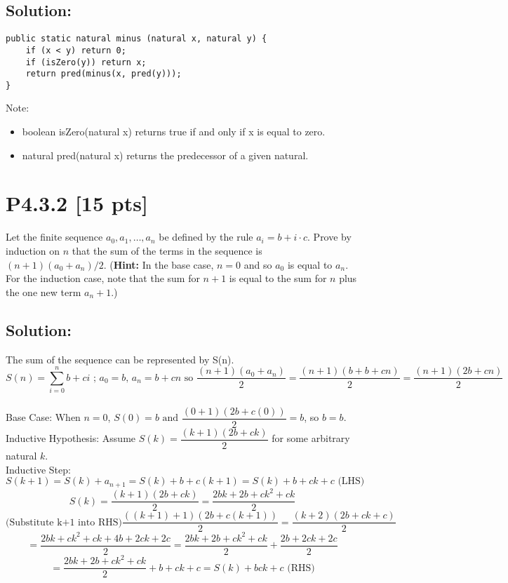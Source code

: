 \documentclass[12pt]{article}
\begin{document}
\subsection*{\textbf{Solution:}}

\begin{lstlisting}
public static natural minus (natural x, natural y) {
	if (x < y) return 0;
	if (isZero(y)) return x;
	return pred(minus(x, pred(y)));
}
\end{lstlisting}

Note:\\
\begin{itemize}
	\item boolean isZero(natural x) returns true if and only if x is equal to zero.\\
	\item natural pred(natural x) returns the predecessor of a given natural.
\end{itemize}

\newpage
\section*{\textbf{P4.3.2} [15 pts]}
Let the finite sequence $a_0, a_1, \ldots, a_n$ be defined by the rule $a_i = b + i \cdot c$. Prove by induction on $n$ that the sum of the terms in the sequence is $(n + 1)(a_0 + a_n)/2$. (\textbf{Hint:} In the base case, $n = 0$ and so $a_0$ is equal to $a_n$. For the induction case, note that the sum for $n + 1$ is equal to the sum for $n$ plus the one new term $a_n+1$.)


\subsection*{\textbf{Solution:}}

The sum of the sequence can be represented by S(n).\\
\[ S(n) = \sum_{i=0}^{n} b + ci \text{ ; } a_0 = b \text{, } a_n = b+cn \text{ so } \dfrac{(n + 1)(a_0 + a_n)}{2}  = \dfrac{(n + 1)(b + b+cn)}{2} = \dfrac{(n+1)(2b+cn)}{2} \] \\

Base Case: When $n=0$, $S(0) = b \text{ and } \dfrac{(0+1)(2b+c(0))}{2} = b$, so $b = b$.\\

Inductive Hypothesis: Assume $S(k) = \dfrac{(k+1)(2b+ck)}{2}$ for some arbitrary natural $k$.\\

Inductive Step: \[ S(k+1) = S(k) + a_{n+1} = S(k) + b + c(k+1) = S(k) + b+ck+c \text{ (LHS)}\]
			    \[ S(k) = \dfrac{(k+1)(2b+ck)}{2} = \dfrac{2bk+2b+ck^2+ck}{2} \]
			    \[ \text{(Substitute k+1 into RHS)} \dfrac{((k+1)+1)(2b+c(k+1))}{2} = \dfrac{(k+2)(2b+ck + c)}{2} \]
			    \[ = \dfrac{2bk+ck^2+ck+4b+2ck+2c}{2} = \dfrac{2bk+2b+ck^2+ck}{2} + \dfrac{2b+2ck+2c}{2} \] 
			    \[ = \dfrac{2bk+2b+ck^2+ck}{2} + b+ck+c = S(k) + b ck+c \text{ (RHS)} \]\\
\end{document}
